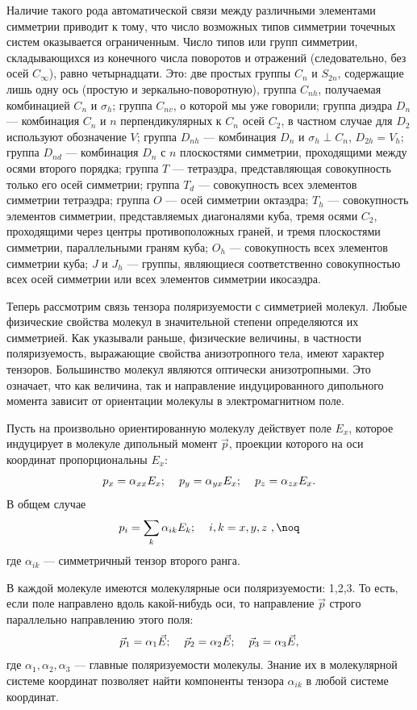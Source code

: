 Наличие такого рода автоматической связи между различными
элементами симметрии приводит к тому, что число возможных типов
симметрии точечных систем оказывается ограниченным. Число типов
или групп симметрии, складывающихся из конечного числа поворотов и
отражений (следовательно, без осей $C_{\infty}$), равно
четырнадцати. Это: две простых группы $C_n$ и $S_{2n}$, содержащие
лишь одну ось (простую и зеркально-поворотную), группа $C_{nh}$,
получаемая комбинацией $C_n$ и $\sigma_h$; группа $C_{nv}$, о
которой мы уже говорили; группа диэдра $D_n$ --- комбинация $C_n$
и $n$ перпендикулярных к $C_n$ осей $C_2$, в частном случае для
$D_2$ используют обозначение $V$; группа $D_{nh}$ --- комбинация
$D_n$ и $\sigma_h\perp C_n$, $D_{2h}=V_h$; группа $D_{nd}$ ---
комбинация $D_n$ с $n$ плоскостями симметрии, проходящими между
осями второго порядка; группа $T$ --- тетраэдра, представляющая
совокупность только его осей симметрии; группа $T_d$ ---
совокупность всех элементов симметрии тетраэдра; группа $O$ ---
осей симметрии октаэдра; $T_h$ --- совокупность элементов
симметрии, представляемых диагоналями куба, тремя осями $C_2$,
проходящими через центры противоположных граней, и тремя
плоскостями симметрии, параллельными граням куба; $O_h$ ---
совокупность всех элементов симметрии куба; $J$ и $J_h$ ---
группы, являющиеся соответственно совокупностью всех осей
симметрии или всех элементов симметрии икосаэдра.

Теперь рассмотрим связь тензора поляризуемости с симметрией
молекул. Любые физические свойства молекул в значительной степени
определяются их симметрией. Как указывали раньше, физические
величины, в частности поляризуемость, выражающие свойства
анизотропного тела, имеют характер тензоров. Большинство молекул
являются оптически анизотропными. Это означает, что как величина,
так и направление индуцированного дипольного момента зависит от
ориентации молекулы в электромагнитном поле.

Пусть на произвольно ориентированную молекулу действует поле
$E_x$, которое индуцирует в молекуле дипольный момент $\vec p$,
проекции которого на оси координат пропорциональны $E_x$:
$$p_x=\alpha_{xx}E_x;\hskip 4mm p_y=\alpha_{yx}E_x;\hskip 4mm
p_z=\alpha_{zx}E_x.$$ В общем случае
$$p_i=\sum\limits_k\alpha_{ik}E_k;\hskip 4mm i,k=x,y,z\ ,\noq$$
где $\alpha_{ik}$ --- симметричный тензор второго ранга.

В каждой молекуле имеются молекулярные оси поляризуемости: 1,2,3.
То есть, если поле направлено вдоль какой-нибудь оси, то
направление $\vec p$ строго параллельно направлению этого поля:
$$\vec p_1=\alpha_1\vec E;\hskip 4mm\vec p_2=\alpha_2\vec
E;\hskip 4mm\vec p_3=\alpha_3\vec E,$$ где
$\alpha_1,\alpha_2,\alpha_3$ --- главные поляризуемости молекулы.
Знание их в молекулярной системе координат позволяет найти
компоненты тензора $\alpha_{ik}$ в любой системе координат.


